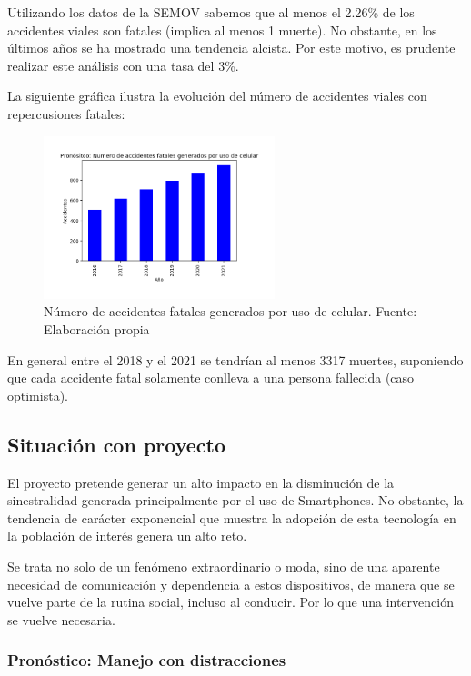 \documentclass{article}
\begin{document}
Utilizando los datos de la SEMOV sabemos que al menos el 2.26\% de los accidentes viales
son fatales (implica al menos 1 muerte). No obstante, en los últimos años se ha mostrado una tendencia alcista. Por 
este motivo, es prudente realizar este análisis con una tasa del 3\%.

La siguiente gráfica ilustra la evolución del número de accidentes viales con repercusiones fatales:  

	\begin{figure}[H]\centering
	\includegraphics[width=0.6\textwidth]{resources/img/smart_accidents_deaths.png}
	\caption{\label{fig:prono_accidentes_fatales} Número de accidentes fatales generados por uso de celular. Fuente: Elaboración propia}
    \end{figure}

En general entre el 2018 y el 2021 se tendrían al menos 3317 muertes, suponiendo que cada accidente fatal solamente 
conlleva a una persona fallecida (caso optimista). 

\subsection{Situación con proyecto}

El proyecto pretende generar un alto impacto en la disminución de la sinestralidad generada principalmente por el uso
de Smartphones. No obstante, la tendencia de carácter exponencial que muestra la adopción de esta tecnología en la
población de interés genera un alto reto.

Se trata no solo de un fenómeno extraordinario o moda, sino de una aparente necesidad de comunicación y dependencia a estos dispositivos, de manera que se vuelve parte de la rutina social, incluso al conducir. Por lo que una intervención se vuelve necesaria.  

\subsubsection{Pronóstico: Manejo con distracciones}
\end{document}
